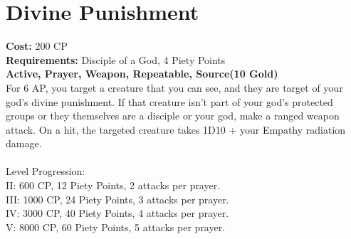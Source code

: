 \section{Divine Punishment}
\textbf{Cost:} 200 CP\\
\textbf{Requirements:} Disciple of a God, 4 Piety Points \\
\textbf{Active, Prayer, Weapon, Repeatable, Source(10 Gold)}\\
For 6 AP, you target a creature that you can see, and they are target of your god's divine punishment. If that creature isn't part of your god's protected groups or they themselves are a disciple or your god, make a ranged weapon attack. On a hit, the targeted creature takes 1D10 + your Empathy radiation damage.\\
\\
Level Progression:\\
II: 600 CP, 12 Piety Points, 2 attacks per prayer.\\
III: 1000 CP, 24 Piety Points, 3 attacks per prayer.\\
IV: 3000 CP, 40 Piety Points, 4 attacks per prayer.\\
V: 8000 CP, 60 Piety Points, 5 attacks per prayer.\\